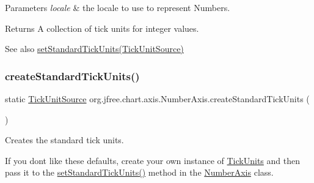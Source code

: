 \begin{DoxyParams}{Parameters}
{\em locale} & the locale to use to represent Numbers.\\
\hline
\end{DoxyParams}
\begin{DoxyReturn}{Returns}
A collection of tick units for integer values.
\end{DoxyReturn}
\begin{DoxySeeAlso}{See also}
\mbox{\hyperlink{classorg_1_1jfree_1_1chart_1_1axis_1_1_value_axis_ac84e1ffa28cdea7b355306ae472d21a2}{set\+Standard\+Tick\+Units(\+Tick\+Unit\+Source)}} 
\end{DoxySeeAlso}
\mbox{\label{classorg_1_1jfree_1_1chart_1_1axis_1_1_number_axis_ac9f43609e3f99cac998a2ece777809c6}} 
\subsubsection{\texorpdfstring{create\+Standard\+Tick\+Units()}{createStandardTickUnits()}\hspace{0.1cm}{\footnotesize\ttfamily [1/2]}}
{\footnotesize\ttfamily static \mbox{\hyperlink{interfaceorg_1_1jfree_1_1chart_1_1axis_1_1_tick_unit_source}{Tick\+Unit\+Source}} org.\+jfree.\+chart.\+axis.\+Number\+Axis.\+create\+Standard\+Tick\+Units (\begin{DoxyParamCaption}{ }\end{DoxyParamCaption})\hspace{0.3cm}{\ttfamily [static]}}

Creates the standard tick units. 

If you don\textquotesingle{}t like these defaults, create your own instance of \mbox{\hyperlink{classorg_1_1jfree_1_1chart_1_1axis_1_1_tick_units}{Tick\+Units}} and then pass it to the \mbox{\hyperlink{classorg_1_1jfree_1_1chart_1_1axis_1_1_value_axis_ac84e1ffa28cdea7b355306ae472d21a2}{set\+Standard\+Tick\+Units()}} method in the \mbox{\hyperlink{classorg_1_1jfree_1_1chart_1_1axis_1_1_number_axis}{Number\+Axis}} class.

